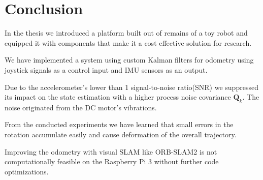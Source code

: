 \documentclass[class=report, crop=false]{standalone}
\begin{document}
\chapter{Conclusion}\label{cha:conclusion}

In the thesis we introduced a platform built out of remains of a toy robot and equipped it with components that make it a cost effective solution for research.

We have implemented a system using custom Kalman filters for odometry using joystick signals as a control input and IMU sensors as an output.

Due to the accelerometer's lower than 1 signal-to-noise ratio(SNR) we suppressed its impact on the state estimation with a higher process noise covariance $\textbf{Q}_k$. The noise originated from the DC motor's vibrations.

From the conducted experiments we have learned that small errors in the rotation accumulate easily and cause deformation of the overall trajectory.

Improving the odometry with visual SLAM like ORB-SLAM2\cite{mur2017orb} is not computationally feasible on the Raspberry Pi 3 without further code optimizations.
\end{document}
